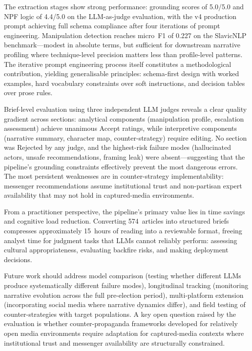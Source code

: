 \documentclass[10pt, a4paper]{article}
\begin{document}
The extraction stages show strong performance: grounding scores of 5.0/5.0 and NPF logic of 4.4/5.0 on the LLM-as-judge evaluation, with the v4 production prompt achieving full schema compliance after four iterations of prompt engineering. Manipulation detection reaches micro~F1 of 0.227 on the SlavicNLP benchmark---modest in absolute terms, but sufficient for downstream narrative profiling where technique-level precision matters less than profile-level patterns. The iterative prompt engineering process itself constitutes a methodological contribution, yielding generalisable principles: schema-first design with worked examples, hard vocabulary constraints over soft instructions, and decision tables over prose rules.

Brief-level evaluation using three independent LLM judges reveals a clear quality gradient across sections: analytical components (manipulation profile, escalation assessment) achieve unanimous Accept ratings, while interpretive components (narrative summary, character map, counter-strategy) require editing. No section was Rejected by any judge, and the highest-risk failure modes (hallucinated actors, unsafe recommendations, framing leak) were absent---suggesting that the pipeline's grounding constraints effectively prevent the most dangerous errors. The most persistent weaknesses are in counter-strategy implementability: messenger recommendations assume institutional trust and non-partisan expert availability that may not hold in captured-media environments.

From a practitioner perspective, the pipeline's primary value lies in time savings and cognitive load reduction. Converting 574~articles into structured briefs compresses approximately 15~hours of reading into a reviewable format, freeing analyst time for judgment tasks that LLMs cannot reliably perform: assessing cultural appropriateness, evaluating backfire risks, and making deployment decisions.

Future work should address model comparison (testing whether different LLMs produce systematically different failure modes), longitudinal tracking (monitoring narrative evolution across the full pre-election period), multi-platform extension (incorporating social media where narrative dynamics differ), and field testing of counter-strategies with target populations. A key open question raised by the evaluation is whether counter-propaganda frameworks developed for relatively open media environments require adaptation for captured-media contexts where institutional trust and messenger availability are structurally constrained.
\end{document}
